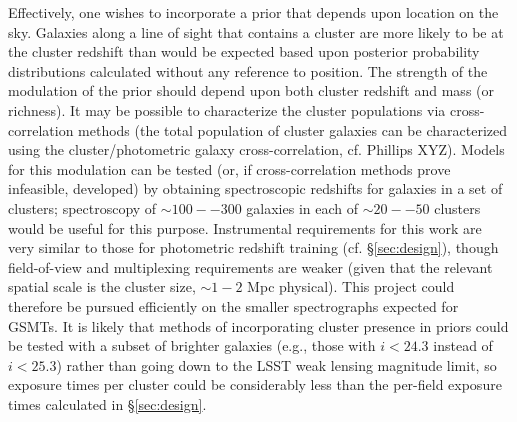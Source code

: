 Effectively, one wishes to incorporate a prior that depends upon location on the sky.  Galaxies along a line of sight that contains a cluster are more likely to be at the cluster redshift than would be expected based upon posterior probability distributions calculated without any reference to position.   The strength of the modulation of the prior should depend upon both cluster redshift and mass (or richness).  It may be possible to characterize the cluster populations via cross-correlation methods (the total population of cluster galaxies can be characterized using the cluster/photometric galaxy cross-correlation, cf. Phillips XYZ).  Models for this modulation can be tested (or, if cross-correlation methods prove infeasible, developed) by obtaining spectroscopic redshifts for galaxies in a set of clusters; spectroscopy of $\sim 100--300$ galaxies in each of $\sim 20--50$ clusters would be useful for this purpose.  Instrumental requirements for this work are very similar to those for photometric redshift training (cf. \S \ref{sec:design}), though field-of-view and multiplexing requirements are weaker (given that the relevant spatial scale is the cluster size, $\sim 1-2$ Mpc physical).  This project could therefore be pursued efficiently on the smaller spectrographs expected for GSMTs.  It is likely that methods of incorporating cluster presence in priors could be tested with a subset of brighter galaxies (e.g., those with $i<24.3$ instead of $i<25.3$) rather than going down to the LSST weak lensing magnitude limit, so exposure times per cluster could be considerably less than the per-field exposure times calculated in \S \ref{sec:design}.


%
%
